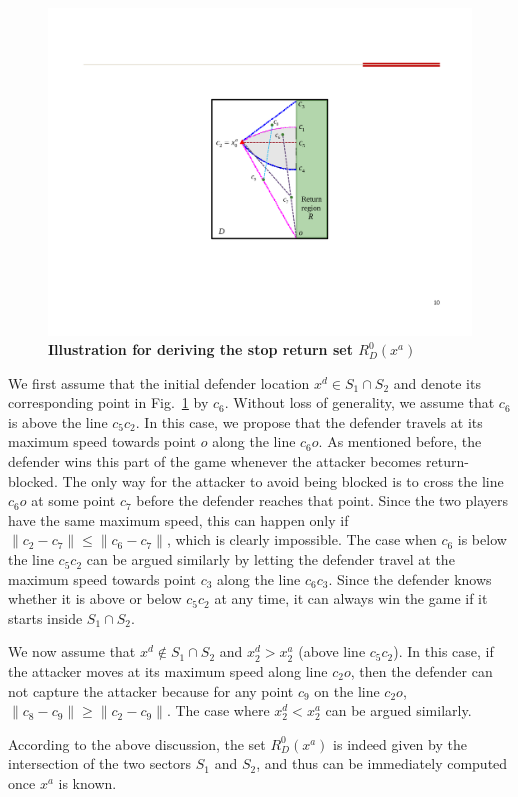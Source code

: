 \begin{figure}[htbp]
	\centering
	\includegraphics[width=0.7\columnwidth]{figures/RD0}
	\caption{\textbf{Illustration for deriving the stop return set $R_D^0(x^a)$}}
	\label{fig:RD0}
\end{figure}

We first assume that the initial defender location $x^d\in S_1\cap S_2$ and denote its corresponding point in Fig.~\ref{fig:RD0} by $c_6$. Without loss of generality, we assume that $c_6$ is above the line $c_5c_2$. In this case, we propose that the defender travels at its maximum speed towards point $o$ along the line $c_6o$. As mentioned before, the defender wins this part of the game whenever the attacker becomes return-blocked. The only way for the attacker to avoid being blocked is to cross the line $c_6o$ at some point $c_7$ before the defender reaches that point. Since the two players have the same maximum speed, this can happen only if $\|c_2-c_7\|\le\|c_6-c_7\|$, which is clearly impossible. The case when $c_6$ is below the line $c_5c_2$ can be argued similarly by letting the defender travel at the maximum speed towards point $c_3$ along the line $c_6c_3$. Since the defender knows whether it is above or below $c_5c_2$ at any time, it can always win the game if it starts inside $S_1\cap S_2$. 

We now assume that $x^d\notin S_1\cap S_2$ and $x^d_2>x^a_2$ (above line $c_5c_2$). In this case, if the attacker moves at its maximum speed along line $c_2o$, then the defender can not capture the attacker because for any point $c_9$ on the line $c_2o$, $\|c_8-c_9\|\ge \|c_2-c_9\|$. The case where $x^d_2<x^a_2$ can be argued similarly. 

According to the above discussion, the set $R_D^0(x^a)$ is indeed given by the intersection of the two sectors $S_1$ and $S_2$, and thus can be immediately computed once $x^a$ is known. 

